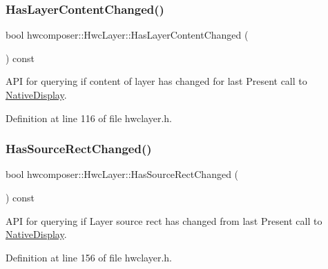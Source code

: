 \subsubsection{\texorpdfstring{Has\+Layer\+Content\+Changed()}{HasLayerContentChanged()}}
{\footnotesize\ttfamily bool hwcomposer\+::\+Hwc\+Layer\+::\+Has\+Layer\+Content\+Changed (\begin{DoxyParamCaption}{ }\end{DoxyParamCaption}) const\hspace{0.3cm}{\ttfamily [inline]}}

A\+PI for querying if content of layer has changed for last Present call to \mbox{\hyperlink{classhwcomposer_1_1NativeDisplay}{Native\+Display}}. 

Definition at line 116 of file hwclayer.\+h.


\begin{DoxyCode}{0}
\end{DoxyCode}
\mbox{\label{structhwcomposer_1_1HwcLayer_a2dbe49a6892208c58f09858f6f01a311}} 
\subsubsection{\texorpdfstring{Has\+Source\+Rect\+Changed()}{HasSourceRectChanged()}}
{\footnotesize\ttfamily bool hwcomposer\+::\+Hwc\+Layer\+::\+Has\+Source\+Rect\+Changed (\begin{DoxyParamCaption}{ }\end{DoxyParamCaption}) const\hspace{0.3cm}{\ttfamily [inline]}}

A\+PI for querying if Layer source rect has changed from last Present call to \mbox{\hyperlink{classhwcomposer_1_1NativeDisplay}{Native\+Display}}. 

Definition at line 156 of file hwclayer.\+h.


\begin{DoxyCode}{0}
\end{DoxyCode}
\mbox{\label{structhwcomposer_1_1HwcLayer_afdc82d35f4385b0f3caa3541aa8abedb}} 
